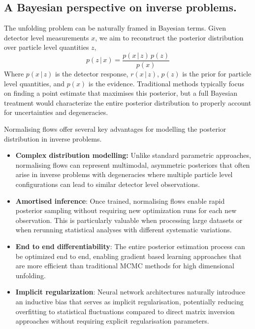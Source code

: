 \subsection{A Bayesian perspective on inverse problems.}
    The unfolding problem can be naturally framed in Bayesian terms.
    Given detector level measurements \(x\), we aim to reconstruct the posterior distribution over particle level quantities \(z\),
    \[
        \label{eq:bayes-theorem}
        p(z\,|\,x) = \frac{p(x\,|\,z)\,p(z)}{p(x)}
    \]
    Where $p(x\,|\,z)$ is the detector response, \(r(x\,|\,z)\), $p(z)$ is the prior for particle level quantities, and $p(x)$ is the evidence.
    Traditional methods typically focus on finding a point estimate that maximises this posterior, but a full Bayesian treatment would characterize the entire posterior distribution to properly account for uncertainties and degeneracies.

    Normalising flows offer several key advantages for modelling the posterior distribution in inverse problems.
    \begin{itemize}
        \item \textbf{Complex distribution modelling:} Unlike standard parametric approaches, normalising flows can represent multimodal, asymmetric posteriors that often arise in inverse problems with degeneracies where multiple particle level configurations can lead to similar detector level observations.
        \item \textbf{Amortised inference}: Once trained, normalising flows enable rapid posterior sampling without requiring new optimization runs for each new observation.
            This is particularly valuable when processing large datasets or when rerunning statistical analyses with different systematic variations.
        \item \textbf{End to end differentiability}: The entire posterior estimation process can be optimized end to end, enabling gradient based learning approaches that are more efficient than traditional MCMC methods for high dimensional unfolding.
        \item \textbf{Implicit regularization}: Neural network architectures naturally introduce an inductive bias that serves as implicit regularisation, potentially reducing overfitting to statistical fluctuations compared to direct matrix inversion approaches without requiring explicit regularisation parameters.
    \end{itemize}
